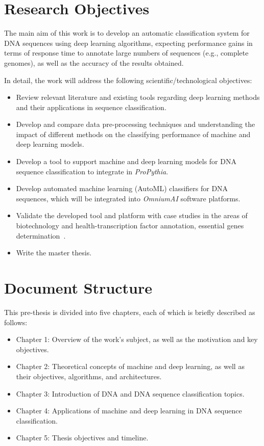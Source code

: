 \section{Research Objectives} \label{sec:research_objectives}

The main aim of this work is to develop an automatic classification system for DNA sequences using deep learning algorithms, expecting performance gains in terms of response time to annotate large numbers of sequences (e.g., complete genomes), as well as the accuracy of the results obtained. 

In detail, the work will address the following scientific/technological objectives:

\begin{itemize}
    \item Review relevant literature and existing tools regarding deep learning methods and their applications in sequence classification.
    \item Develop and compare data pre-processing techniques and understanding the impact of different methods on the classifying performance of machine and deep learning models.
    \item Develop a tool to support machine and deep learning models for DNA sequence classification to integrate in \textit{ProPythia}.
    \item Develop automated machine learning (AutoML) classifiers for DNA sequences, which will be integrated into \textit{OmniumAI} software platforms.
    \item Validate the developed tool and platform with case studies in the areas of biotechnology and health-transcription factor annotation, essential genes determination~\cite{Zhang2020DeepHE:Learning,Quang2016DanQ:Sequences,Novakovsky2021BiologicallyPrediction}.
    \item Write the master thesis.
\end{itemize} 


\section{Document Structure} \label{sec:document_structure}

This pre-thesis is divided into five chapters, each of which is briefly described as follows:

\begin{itemize}
    \item Chapter 1: Overview of the work's subject, as well as the motivation and key objectives.
    \item Chapter 2: Theoretical concepts of machine and deep learning, as well as their objectives, algorithms, and architectures. 
    \item Chapter 3: Introduction of DNA and DNA sequence classification topics.
    \item Chapter 4: Applications of machine and deep learning in DNA sequence classification.
    \item Chapter 5: Thesis objectives and timeline. 
\end{itemize}